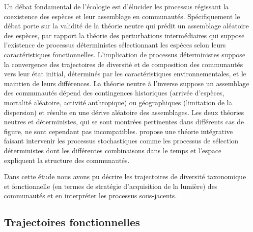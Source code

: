 \documentclass[
  11pt,
  french,
  A4paper,
  extrafontsizes,onecolumn,openright
  ]{memoir}
\begin{document}
Un débat fondamental de l'écologie est d'élucider les processus
régissant la coexistence des espèces et leur assemblage en communautés.
Spécifiquement le débat porte sur la validité de la théorie neutre qui
prédit un assemblage aléatoire des espèces, par rapport la théorie des
perturbations intermédiaires qui suppose l'existence de processus
déterministes sélectionnant les espèces selon leurs caractéristiques
fonctionnelles. L'implication de processus déterministes suppose la
convergence des trajectoires de diversité et de composition des
communautés vers leur état initial, déterminés par les caractéristiques
environnementales, et le maintien de leurs différences. La théorie
neutre à l'inverse suppose un assemblage des communautés dépend des
contingences historiques (arrivée d'espèces, mortalité aléatoire,
activité anthropique) ou géographiques (limitation de la dispersion) et
résulte en une dérive aléatoire des assemblages. Les deux théories
neutres et déterministes, qui se sont montrées pertinentes dans
différents cas de figure, ne sont cependant pas incompatibles.
\autocite{Chave2004} propose une théorie intégrative faisant intervenir
les processus stochastiques comme les processus de sélection
déterministes dont les différentes combinaisons dans le temps et
l'espace expliquent la structure des communautés.

Dans cette étude nous avons pu décrire les trajectoires de diversité
taxonomique et fonctionnelle (en termes de stratégie d'acquisition de la
lumière) des communautés et en interpréter les processus sous-jacents.

\subsection{Trajectoires
fonctionnelles}\label{trajectoires-fonctionnelles}
\end{document}
